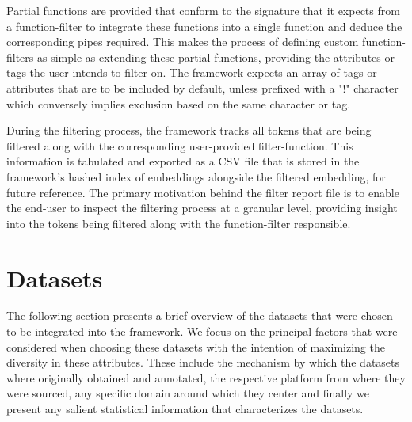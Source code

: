 \documentclass[12pt, a4paper]{report}
\theoremstyle{definition}
\theoremstyle{definition}%
\theoremstyle{definition}%
\theoremstyle{definition}%
\theoremstyle{definition}%
\theoremstyle{definition}%
\begin{document}
Partial functions are provided that conform to the signature that it expects from a function-filter to integrate these functions into a single function and deduce the corresponding pipes required. This makes the process of defining custom function-filters as simple as extending these partial functions, providing the attributes or tags the user intends to filter on. The framework expects an array of tags or attributes that are to be included by default, unless prefixed with a "!" character which conversely implies exclusion based on the same character or tag.

During the filtering process, the framework tracks all tokens that are being filtered along with the corresponding user-provided filter-function. This information is tabulated and exported as a CSV file that is stored in the framework's hashed index of embeddings alongside the filtered embedding, for future reference. The primary motivation behind the filter report file is to enable the end-user to inspect the filtering process at a granular level, providing insight into the tokens being filtered along with the function-filter responsible.

\section{Datasets}
The following section presents a brief overview of the datasets that were chosen to be integrated into the framework. We focus on the principal factors that were considered when choosing these datasets with the intention of maximizing the diversity in these attributes. These include the mechanism by which the datasets where originally obtained and annotated, the respective platform from where they were sourced, any specific domain around which they center and finally we present any salient statistical information that characterizes the datasets.
\end{document}
